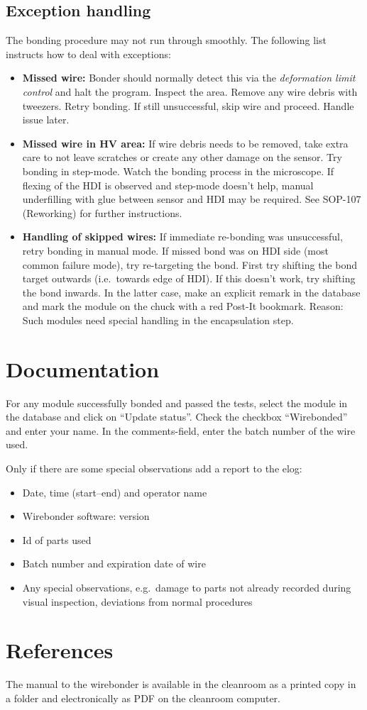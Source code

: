 \documentclass[12pt]{unlsilabsop}
\begin{document}
\subsection{Exception handling}
The bonding procedure may not run through smoothly. The following list instructs how to deal with exceptions:
\begin{itemize}
    \item \textbf{Missed wire:} Bonder should normally detect this via the \emph{deformation limit control} and halt the program. Inspect the area. Remove any wire debris with tweezers. Retry bonding. If still unsuccessful, skip wire and proceed. Handle issue later.
    \item \textbf{Missed wire in HV area:} If wire debris needs to be removed, take extra care to not leave scratches or create any other damage on the sensor. Try bonding in step-mode. Watch the bonding process in the microscope. If flexing of the HDI is observed and step-mode doesn't help, manual underfilling with glue between sensor and HDI may be required. See SOP-107 (Reworking) for further instructions.
    \item \textbf{Handling of skipped wires:} If immediate re-bonding was unsuccessful, retry bonding in manual mode. If missed bond was on HDI side (most common failure mode), try re-targeting the bond. First try shifting the bond target outwards (i.e.~towards edge of HDI). If this doesn't work, try shifting the bond inwards. In the latter case, make an explicit remark in the database and mark the module on the chuck with a red Post-It bookmark. Reason: Such modules need special handling in the encapsulation step.
\end{itemize}

\section{Documentation}
For any module successfully bonded and passed the tests, select the module in the database and click on ``Update status''. Check the checkbox ``Wirebonded'' and enter your name. In the comments-field, enter the batch number of the wire used.

Only if there are some special observations add a report to the elog:
\begin{itemize}
    \item Date, time (start--end) and operator name
    \item Wirebonder software: version
    \item Id of parts used
    \item Batch number and expiration date of wire
    \item Any special observations, e.g.~damage to parts not already recorded during visual inspection, deviations from normal procedures
\end{itemize}


\section{References}

The manual to the wirebonder is available in the cleanroom as a printed copy in a folder and electronically as PDF on the cleanroom computer.
\end{document}
